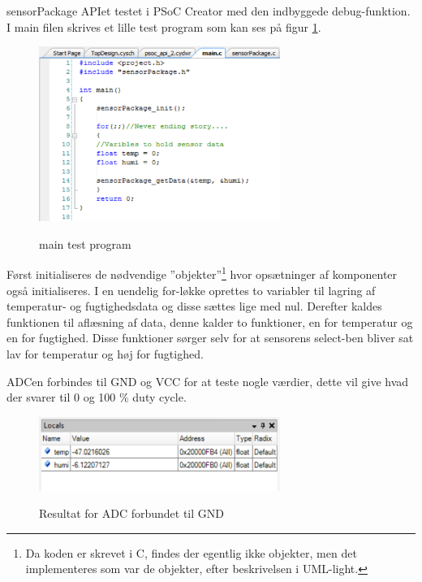 
sensorPackage APIet testet i PSoC Creator med den indbyggede debug-funktion. I main filen skrives et lille test program som kan ses på figur \ref{lab:sht_testmain}.

\begin{figure}[htb]
\centering
{\includegraphics[width=0.70\textwidth]{filer/modultest/Billeder/psoc_testmain}}
\caption{main test program}
\label{lab:sht_testmain}
\end{figure}

Først initialiseres de nødvendige ''objekter''\footnote{Da koden er skrevet i C, findes der egentlig ikke objekter, men det implementeres som var de objekter, efter beskrivelsen i UML-light.} hvor opsætninger af komponenter også initialiseres. I en uendelig for-løkke oprettes to variabler til lagring af temperatur- og fugtighedsdata og disse sættes lige med nul. Derefter kaldes funktionen til aflæsning af data, denne kalder to funktioner, en for temperatur og en for fugtighed. Disse funktioner sørger selv for at sensorens select-ben bliver sat lav for temperatur og høj for fugtighed. 

ADCen forbindes til GND og VCC for at teste nogle værdier, dette vil give hvad der svarer til 0 og 100 \% duty cycle. 
  
\begin{figure}[htb]
\centering
{\includegraphics[width=0.70\textwidth]{filer/modultest/Billeder/psoc_api_test1}}
\caption{Resultat for ADC forbundet til GND}
\label{lab:sht_api_test1}
\end{figure}

